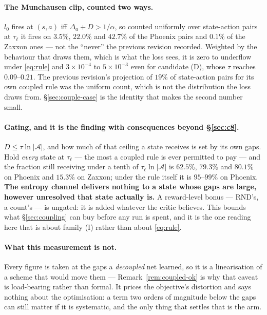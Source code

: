 \documentclass{article}
\newcommand{\actions}{\mathcal{A}}
\newcommand{\gap}{\Delta}
\begin{document}
\paragraph{The Munchausen clip, counted two ways.} $l_0$ fires at $(s,a)$ iff
$\gap_a + D > 1/\alpha$, so counted uniformly over state-action pairs at $\tau_\ell$ it fires on
$3.5\%$, $22.0\%$ and $42.7\%$ of the Phoenix pairs and $0.1\%$ of the Zaxxon ones --- not the
``never'' the previous revision recorded. Weighted by the behaviour that draws them, which is what
the loss sees, it is zero to underflow under \eqref{eq:rule} and $3\times10^{-4}$ to
$5\times10^{-3}$ even for candidate (D), whose $\tau$ reaches $0.09$--$0.21$. The previous
revision's projection of $19\%$ of state-action pairs for its own coupled rule was the uniform
count, which is not the distribution the loss draws from. \S\ref{sec:couple-case} is the identity
that makes the second number small.

\paragraph{Gating, and it is the finding with consequences beyond \S\ref{sec:c8}.} $D \le
\tau\ln|\actions|$, and how much of that ceiling a state receives is set by its own gaps. Hold
\emph{every} state at $\tau_\ell$ --- the most a coupled rule is ever permitted to pay --- and the
fraction still receiving under a tenth of $\tau_\ell\ln|\actions|$ is $62.5\%$, $79.3\%$ and
$80.1\%$ on Phoenix and $15.3\%$ on Zaxxon; under the rule itself it is $95$--$99\%$ on Phoenix.
\textbf{The entropy channel delivers nothing to a state whose gaps are large, however unresolved
that state actually is.} A reward-level bonus --- RND's, a count's --- is ungated: it is added
whatever the critic believes. This bounds what \S\ref{sec:coupling} can buy before any run is
spent, and it is the one reading here that is about family (I) rather than about
\eqref{eq:rule}.

\paragraph{What this measurement is not.} Every figure is taken at the gaps a \emph{decoupled}
net learned, so it is a linearisation of a scheme that would move them --- Remark~\ref{rem:coupled-ok}
is why that caveat is load-bearing rather than formal. It prices the objective's distortion and
says nothing about the optimisation: a term two orders of magnitude below the gaps can still
matter if it is systematic, and the only thing that settles that is the arm.
\end{document}
